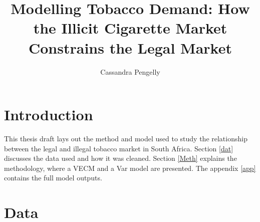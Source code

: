\documentclass[11pt,preprint, authoryear]{elsarticle}
\numberwithin{equation}{section}
\numberwithin{figure}{section}
\numberwithin{table}{section}
\begin{document}
\begin{frontmatter}  %

\title{Modelling Tobacco Demand: How the Illicit Cigarette Market
Constrains the Legal Market}





\author[Add1]{Cassandra Pengelly}
\ead{}





\address[Add1]{Stellenbosch University}



\vspace{1cm}





\vspace{0.5cm}

\end{frontmatter}



\pagestyle{fancy}
\chead{}
\lfoot{}
\lhead{}
\cfoot{}


\headsep 35pt %




\hypertarget{introduction}{%
\section{\texorpdfstring{Introduction
\label{Intro}}{Introduction }}\label{introduction}}

This thesis draft lays out the method and model used to study the
relationship between the legal and illegal tobacco market in South
Africa. Section \ref{dat} discusses the data used and how it was
cleaned. Section \ref{Meth} explains the methodology, where a VECM and a
Var model are presented. The appendix \ref{app} contains the full model
outputs.

\hypertarget{data}{%
\section{\texorpdfstring{Data \label{dat}}{Data }}\label{data}}
\end{document}
